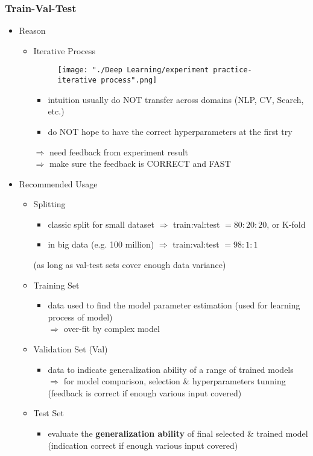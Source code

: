 \subsubsection{Train-Val-Test}
\begin{itemize}
\item Reason
	\begin{itemize}
	\item Iterative Process
		\begin{figure}[!ht]
		\texttt{[image: "./Deep Learning/experiment practice-iterative process".png]}
		\end{figure}
		\begin{itemize}
		\item intuition usually do NOT transfer across domains (NLP, CV, Search, etc.)
		\item do NOT hope to have the correct hyperparameters at the first try
		\end{itemize}
		$\Rightarrow$ need feedback from experiment result \\
		$\Rightarrow$ make sure the feedback is CORRECT and FAST
	\end{itemize}
\item Recommended Usage
	\begin{itemize}
	\item Splitting 
		\begin{itemize}
		\item classic split for small dataset $\Rightarrow$ train:val:test $= 80:20:20$, or K-fold
		\item in big data (e.g. 100 million) $\Rightarrow$ train:val:test $= 98:1:1$
		\end{itemize}
		(as long as val-test sets cover enough data variance)
	\item Training Set
		\begin{itemize}
		\item data used to find the model parameter estimation (used for learning process of model) \\
		$\Rightarrow$ over-fit by complex model
		\end{itemize}
	\item Validation Set (Val)
		\begin{itemize}
		\item data to indicate generalization ability of a range of trained models \\
		$\Rightarrow$ for model comparison, selection \& hyperparameters tunning \\
		(feedback is correct if enough various input covered)
		\end{itemize}
	\item Test Set
		\begin{itemize}
		\item evaluate the \textbf{generalization ability} of final selected \& trained model
		(indication correct if enough various input covered)
		\end{itemize}
	\end{itemize}
	

\end{itemize}
